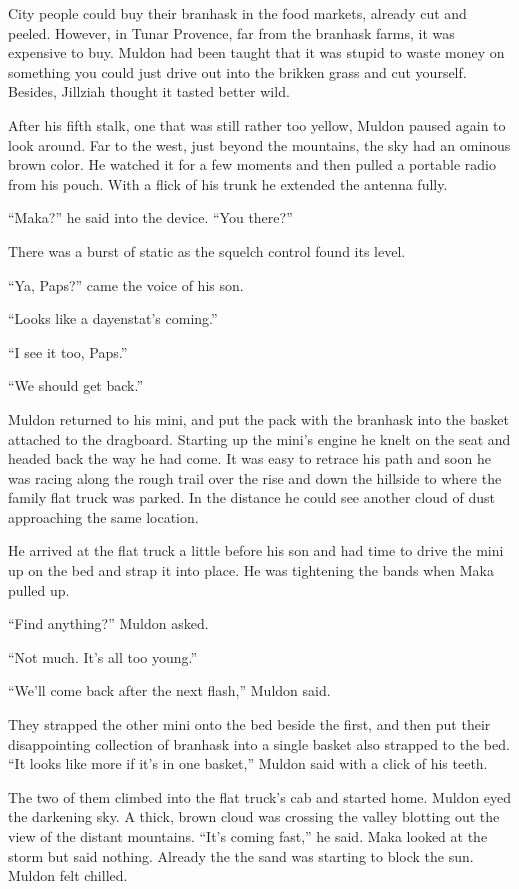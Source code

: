 City people could buy their branhask in the food markets, already cut and peeled. However, in
Tunar Provence, far from the branhask farms, it was expensive to buy. Muldon had been taught
that it was stupid to waste money on something you could just drive out into the brikken grass
and cut yourself. Besides, Jillziah thought it tasted better wild.

After his fifth stalk, one that was still rather too yellow, Muldon paused again to look
around. Far to the west, just beyond the mountains, the sky had an ominous brown color. He
watched it for a few moments and then pulled a portable radio from his pouch. With a flick of
his trunk he extended the antenna fully.

``Maka?'' he said into the device. ``You there?''

There was a burst of static as the squelch control found its level.

``Ya, Paps?'' came the voice of his son.

``Looks like a dayenstat's coming.''

``I see it too, Paps.''

``We should get back.''

Muldon returned to his mini, and put the pack with the branhask into the basket attached to the
dragboard. Starting up the mini's engine he knelt on the seat and headed back the way he had
come. It was easy to retrace his path and soon he was racing along the rough trail over the rise
and down the hillside to where the family flat truck was parked. In the distance he could see
another cloud of dust approaching the same location.

He arrived at the flat truck a little before his son and had time to drive the mini up on the
bed and strap it into place. He was tightening the bands when Maka pulled up.

``Find anything?'' Muldon asked.

``Not much. It's all too young.''

``We'll come back after the next flash,'' Muldon said.

They strapped the other mini onto the bed beside the first, and then put their disappointing
collection of branhask into a single basket also strapped to the bed. ``It looks like more if
it's in one basket,'' Muldon said with a click of his teeth.

The two of them climbed into the flat truck's cab and started home. Muldon eyed the darkening
sky. A thick, brown cloud was crossing the valley blotting out the view of the distant
mountains. ``It's coming fast,'' he said. Maka looked at the storm but said nothing. Already the
the sand was starting to block the sun. Muldon felt chilled.

